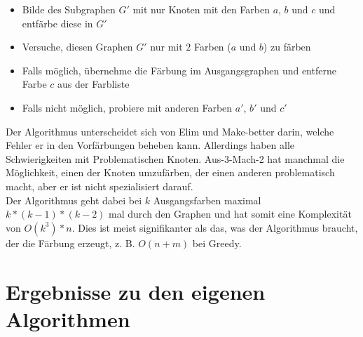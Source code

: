 \documentclass[11pt]{article}
\begin{document}
\begin{itemize}
  \item Bilde des Subgraphen $G'$ mit nur Knoten mit den Farben $a$, $b$ und $c$ und entfärbe diese in $G'$
  \item Versuche, diesen Graphen $G'$ nur mit $2$ Farben ($a$ und $b$) zu färben
  \item Falls möglich, übernehme die Färbung im Ausgangsgraphen und entferne Farbe $c$ aus der Farbliste
  \item Falls nicht möglich, probiere mit anderen Farben $a'$, $b'$ und $c'$
\end{itemize}

Der Algorithmus unterscheidet sich von Elim und Make-better darin, welche Fehler er in den Vorfärbungen beheben kann. Allerdings haben alle Schwierigkeiten mit Problematischen Knoten.
Aus-3-Mach-2 hat manchmal die Möglichkeit, einen der Knoten umzufärben, der einen anderen problematisch macht, aber er ist nicht spezialisiert darauf. \\
Der Algorithmus geht dabei bei $k$ Ausgangsfarben maximal $k*(k-1)*(k-2)$ mal durch den Graphen und hat somit eine Komplexität von $O(k^3)*n$.
Dies ist meist signifikanter als das, was der Algorithmus braucht, der die Färbung erzeugt, z. B. $O(n+m)$ bei Greedy. \\


\section{Ergebnisse zu den eigenen Algorithmen} %
\end{document}
